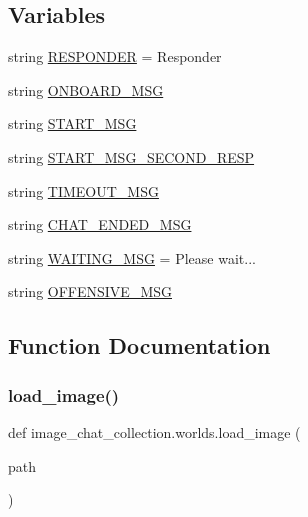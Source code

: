 \subsection*{Variables}
\begin{DoxyCompactItemize}
\item 
string \hyperlink{namespaceimage__chat__collection_1_1worlds_a22c04cbc8759ece080253442ddbb125d}{R\+E\+S\+P\+O\+N\+D\+ER} = \textquotesingle{}Responder\textquotesingle{}
\item 
string \hyperlink{namespaceimage__chat__collection_1_1worlds_afb9a10429b78311675aa02a06385c178}{O\+N\+B\+O\+A\+R\+D\+\_\+\+M\+SG}
\item 
string \hyperlink{namespaceimage__chat__collection_1_1worlds_a0a07648da0f4166bc06223c88e49d68e}{S\+T\+A\+R\+T\+\_\+\+M\+SG}
\item 
string \hyperlink{namespaceimage__chat__collection_1_1worlds_a7c4dd5af21b4ff103ff116d541e1251e}{S\+T\+A\+R\+T\+\_\+\+M\+S\+G\+\_\+\+S\+E\+C\+O\+N\+D\+\_\+\+R\+E\+SP}
\item 
string \hyperlink{namespaceimage__chat__collection_1_1worlds_ad0ef7ea4d3a4f603b9c9c52700aea80f}{T\+I\+M\+E\+O\+U\+T\+\_\+\+M\+SG}
\item 
string \hyperlink{namespaceimage__chat__collection_1_1worlds_af62bcacd30f9acc5c9927f28fd1c0347}{C\+H\+A\+T\+\_\+\+E\+N\+D\+E\+D\+\_\+\+M\+SG}
\item 
string \hyperlink{namespaceimage__chat__collection_1_1worlds_a67cfa4b1bb447ae06398b6b8826ebbfd}{W\+A\+I\+T\+I\+N\+G\+\_\+\+M\+SG} = \textquotesingle{}Please wait...\textquotesingle{}
\item 
string \hyperlink{namespaceimage__chat__collection_1_1worlds_aaec0080d408cae0612fa90d6210b8260}{O\+F\+F\+E\+N\+S\+I\+V\+E\+\_\+\+M\+SG}
\end{DoxyCompactItemize}


\subsection{Function Documentation}
\mbox{\label{namespaceimage__chat__collection_1_1worlds_aa028ae9a4f66d727036827410f5483ec}} 
\subsubsection{\texorpdfstring{load\+\_\+image()}{load\_image()}}
{\footnotesize\ttfamily def image\+\_\+chat\+\_\+collection.\+worlds.\+load\+\_\+image (\begin{DoxyParamCaption}\item[{}]{path }\end{DoxyParamCaption})}



